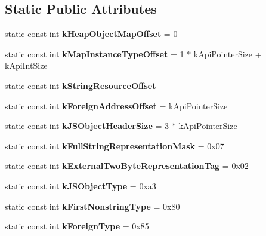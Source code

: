 \subsection*{Static Public Attributes}
\begin{DoxyCompactItemize}
\item 
\hypertarget{classv8_1_1internal_1_1_internals_a0902a596b5656b4592157eaacc020512}{}static const int {\bfseries k\+Heap\+Object\+Map\+Offset} = 0\label{classv8_1_1internal_1_1_internals_a0902a596b5656b4592157eaacc020512}

\item 
\hypertarget{classv8_1_1internal_1_1_internals_a39ea290dfaa9de300bd79aa73a874a88}{}static const int {\bfseries k\+Map\+Instance\+Type\+Offset} = 1 $\ast$ k\+Api\+Pointer\+Size + k\+Api\+Int\+Size\label{classv8_1_1internal_1_1_internals_a39ea290dfaa9de300bd79aa73a874a88}

\item 
static const int {\bfseries k\+String\+Resource\+Offset}
\item 
\hypertarget{classv8_1_1internal_1_1_internals_ad4134449ee39b95e5ac035996aa7d66b}{}static const int {\bfseries k\+Foreign\+Address\+Offset} = k\+Api\+Pointer\+Size\label{classv8_1_1internal_1_1_internals_ad4134449ee39b95e5ac035996aa7d66b}

\item 
\hypertarget{classv8_1_1internal_1_1_internals_af8faf3ff3271d26bafa6ca0ea87e2a57}{}static const int {\bfseries k\+J\+S\+Object\+Header\+Size} = 3 $\ast$ k\+Api\+Pointer\+Size\label{classv8_1_1internal_1_1_internals_af8faf3ff3271d26bafa6ca0ea87e2a57}

\item 
\hypertarget{classv8_1_1internal_1_1_internals_a5c39a86b30463928ea719def66916507}{}static const int {\bfseries k\+Full\+String\+Representation\+Mask} = 0x07\label{classv8_1_1internal_1_1_internals_a5c39a86b30463928ea719def66916507}

\item 
\hypertarget{classv8_1_1internal_1_1_internals_a73faf917416d2519b65c7255e77a74ce}{}static const int {\bfseries k\+External\+Two\+Byte\+Representation\+Tag} = 0x02\label{classv8_1_1internal_1_1_internals_a73faf917416d2519b65c7255e77a74ce}

\item 
\hypertarget{classv8_1_1internal_1_1_internals_a56b7062df5d9a7df491137d4c3341bcc}{}static const int {\bfseries k\+J\+S\+Object\+Type} = 0xa3\label{classv8_1_1internal_1_1_internals_a56b7062df5d9a7df491137d4c3341bcc}

\item 
\hypertarget{classv8_1_1internal_1_1_internals_a6f4a54927b01a11f444fb2f00b47ca1d}{}static const int {\bfseries k\+First\+Nonstring\+Type} = 0x80\label{classv8_1_1internal_1_1_internals_a6f4a54927b01a11f444fb2f00b47ca1d}

\item 
\hypertarget{classv8_1_1internal_1_1_internals_a263195f36f9e8ee64af70dc267a85d55}{}static const int {\bfseries k\+Foreign\+Type} = 0x85\label{classv8_1_1internal_1_1_internals_a263195f36f9e8ee64af70dc267a85d55}

\end{DoxyCompactItemize}


